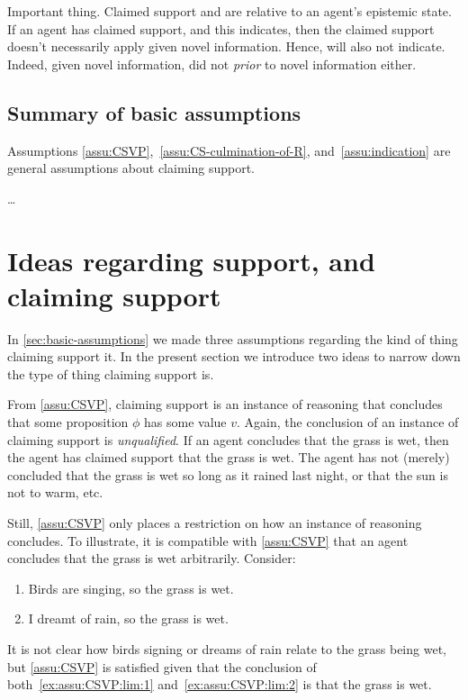 \begin{note}
  \color{red}
  Important thing.
  Claimed support and  are relative to an agent's epistemic state.
  If an agent has claimed support, and this indicates, then the claimed support doesn't necessarily apply given novel information.
  Hence, will also not indicate.
  Indeed, given novel information, did not \indicateN{} \emph{prior} to novel information either.
\end{note}

\subsection{Summary of basic assumptions}
\label{sec:summary}

\begin{note}
  Assumptions \ref{assu:CSVP},~\ref{assu:CS-culmination-of-R}, and~\ref{assu:indication} are general assumptions about claiming support.

\color{red} \dots
\end{note}

\section{Ideas regarding support, and claiming support}
\label{sec:two-ideas}

\begin{note}
    In \autoref{sec:basic-assumptions} we made three assumptions regarding the kind of thing claiming support it.
  In the present section we introduce two ideas to narrow down the type of thing claiming support is.
\end{note}

\begin{note}
  From \autoref{assu:CSVP}, claiming support is an instance of reasoning that concludes that some proposition \(\phi\) has some value \(v\).
  Again, the conclusion of an instance of claiming support is \emph{unqualified}.
  If an agent concludes that the grass is wet, then the agent has claimed support that the grass is wet.
  The agent has not (merely) concluded that the grass is wet so long as it rained last night, or that the sun is not to warm, etc.\

  Still, \autoref{assu:CSVP} only places a restriction on how an instance of reasoning concludes.
  To illustrate, it is compatible with \autoref{assu:CSVP} that an agent concludes that the grass is wet arbitrarily.
  Consider:
  \begin{enumerate}
  \item\label{ex:assu:CSVP:lim:1} Birds are singing, so the grass is wet.
  \item\label{ex:assu:CSVP:lim:2} I dreamt of rain, so the grass is wet.
  \end{enumerate}
  It is not clear how birds signing or dreams of rain relate to the grass being wet, but \autoref{assu:CSVP} is satisfied given that the conclusion of both~\ref{ex:assu:CSVP:lim:1} and~\ref{ex:assu:CSVP:lim:2} is that the grass is wet.
\end{note}

